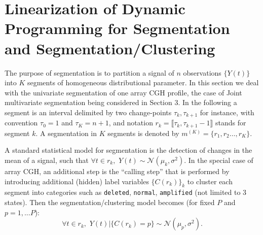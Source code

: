 \documentclass[11pt]{llncs}
\begin{document}
\section{Linearization of Dynamic Programming for Segmentation and Segmentation/Clustering} 

The purpose of segmentation is to partition a signal of $n$ observations $\{Y(t)\}$ into $K$ segments of homogeneous distributional parameter. In this section we deal with the univariate segmentation of one array CGH profile, the case of Joint multivariate segmentation being considered in Section 3. In the following a segment is an interval delimited by two change-points $\tau_k, \tau_{k+1}$ for instance,  with convention $\tau_0 = 1$ and $\tau_K = n+1$, and notation $r_k=\llbracket \tau_k, \tau_{k+1} -1\rrbracket$ stands for segment $k$. A segmentation in $K$ segments is denoted by $m^{(K)} = \{r_1, r_2 \ldots, r_K\}$.

A standard statistical model for segmentation is the detection of changes in the mean of a signal, such that $\forall t \in r_k, \,\, Y(t)\sim \mathcal{N}(\mu_k,\sigma^2).$ In the special case of array CGH, an additional step is the ``calling step'' that is performed by introducing additional (hidden) label variables $\{C(r_k)\}_k$ to cluster each segment into categories such as \texttt{deleted}, \texttt{normal}, \texttt{amplified} (not limited to 3 states). Then the segmentation/clustering model becomes (for fixed $P$ and $p=1,...P$):  $$\forall t \in r_k, \,\, Y(t)|\{C(r_k)=p\} \sim \mathcal{N}(\mu_p,\sigma^2).$$
\end{document}
